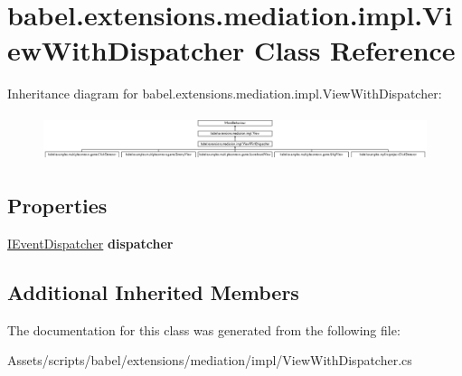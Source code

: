 \hypertarget{classbabel_1_1extensions_1_1mediation_1_1impl_1_1_view_with_dispatcher}{\section{babel.\-extensions.\-mediation.\-impl.\-View\-With\-Dispatcher Class Reference}
\label{classbabel_1_1extensions_1_1mediation_1_1impl_1_1_view_with_dispatcher}
}
Inheritance diagram for babel.\-extensions.\-mediation.\-impl.\-View\-With\-Dispatcher\-:\begin{figure}[H]
\begin{center}
\leavevmode
\includegraphics[height=1.349398cm]{classbabel_1_1extensions_1_1mediation_1_1impl_1_1_view_with_dispatcher}
\end{center}
\end{figure}
\subsection*{Properties}
\begin{DoxyCompactItemize}
\item 
\hypertarget{classbabel_1_1extensions_1_1mediation_1_1impl_1_1_view_with_dispatcher_af4706b1f5c4bfcccd22dfca3e466fa9f}{\hyperlink{interfacebabel_1_1extensions_1_1dispatcher_1_1eventdispatcher_1_1api_1_1_i_event_dispatcher}{I\-Event\-Dispatcher} {\bfseries dispatcher}}\label{classbabel_1_1extensions_1_1mediation_1_1impl_1_1_view_with_dispatcher_af4706b1f5c4bfcccd22dfca3e466fa9f}

\end{DoxyCompactItemize}
\subsection*{Additional Inherited Members}


The documentation for this class was generated from the following file\-:\begin{DoxyCompactItemize}
\item 
Assets/scripts/babel/extensions/mediation/impl/View\-With\-Dispatcher.\-cs\end{DoxyCompactItemize}
